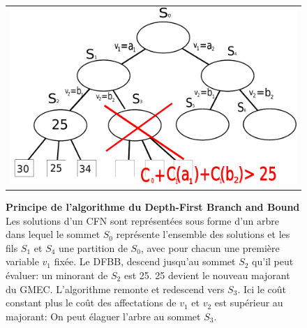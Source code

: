 \begin{figure}[!htbp]
  \centering
  \begin{tabular}{c}
    \includegraphics[width=12cm]{figure/DFBB.pdf} \\
  \end{tabular}
  \caption{\textbf{Principe de l'algorithme du Depth-First Branch and Bound} Les solutions d'un CFN sont représentées sous forme d'un arbre dans lequel le sommet $S_0$ représente l'ensemble des solutions et les fils $S_1$ et $S_4$ une partition de $S_0$, avec pour chacun une première variable $v_1$ fixée. Le DFBB, descend jusqu'au sommet $S_2$ qu'il peut évaluer: un minorant de $S_2$ est 25. 25 devient le nouveau majorant du GMEC. L'algorithme remonte et redescend vers $S_3$. Ici le coût constant plus le coût des affectations de $v_1$ et $v_2$ est supérieur au majorant: On peut élaguer l'arbre au sommet $S_3$.}
  \label{fig:DFBB}  
\end{figure}

